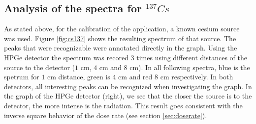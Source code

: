 \documentclass[a4paper]{article}
\begin{document}
\subsection{Analysis of the spectra for $^{137}Cs$}

As stated above, for the calibration of the application, a known cesium source was used. Figure \ref{fig:cs137} shows the resulting spectrum of that source. The peaks that were recognizable were annotated directly in the graph. Using the HPGe detector the spectrum was recored 3 times using different distances of the source to the detector ($1$ cm, $4$ cm  and $8$ cm). In all following spectra, blue is the spetrum for $1$ cm distance, green is $4$ cm and red $8$ cm respectively.
\newline
In both detectors, all interesting peaks can be recognized when investigating the graph. In the graph of the HPGe detector (right), we see that the closer the source is to the detector, the more intense is the radiation. This result goes consistent with the inverse square behavior of the dose rate (see section \ref{sec:doserate}).
\end{document}
